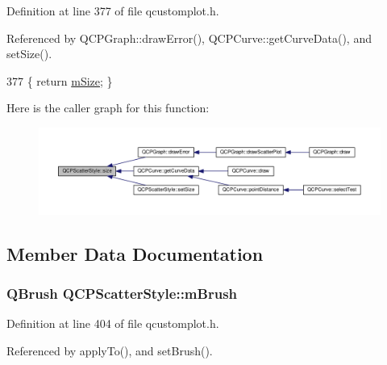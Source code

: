 Definition at line 377 of file qcustomplot.\+h.



Referenced by Q\+C\+P\+Graph\+::draw\+Error(), Q\+C\+P\+Curve\+::get\+Curve\+Data(), and set\+Size().


\begin{DoxyCode}
377 \{ \textcolor{keywordflow}{return} \hyperlink{class_q_c_p_scatter_style_a757da98671eb06b221979373ac2cec91}{mSize}; \}
\end{DoxyCode}


Here is the caller graph for this function\+:\nopagebreak
\begin{figure}[H]
\begin{center}
\leavevmode
\includegraphics[width=350pt]{class_q_c_p_scatter_style_a1973ee650368f1c5f55507b78473f634_icgraph}
\end{center}
\end{figure}




\subsection{Member Data Documentation}
\hypertarget{class_q_c_p_scatter_style_a1b9c6ab10aebcaf236f1f45d1d6d64d1}{}
\subsubsection[{m\+Brush}]{\setlength{\rightskip}{0pt plus 5cm}Q\+Brush Q\+C\+P\+Scatter\+Style\+::m\+Brush\hspace{0.3cm}{\ttfamily [protected]}}\label{class_q_c_p_scatter_style_a1b9c6ab10aebcaf236f1f45d1d6d64d1}


Definition at line 404 of file qcustomplot.\+h.



Referenced by apply\+To(), and set\+Brush().

\hypertarget{class_q_c_p_scatter_style_a813cb074744dc5a2f59cc99d6a10c6f0}{}
